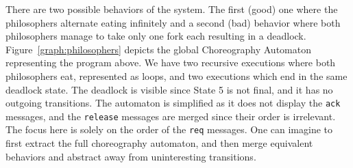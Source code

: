There are two possible behaviors of the system. The first (good) one where the philosophers alternate eating infinitely and a second (bad) behavior 
where both philosophers
manage to take only one fork each %
resulting in a deadlock. 
Figure~\ref{graph:philosophers} depicts the global Choreography Automaton
representing the program above. 
We have two recursive executions where both philosophers
eat, represented as loops, and two executions which end in the same
deadlock state.
%
%
The deadlock is 
visible since State 5 is not final, and it has no outgoing transitions.
  The automaton is simplified %
  as it does not display the \texttt{ack} messages, and the
  \texttt{release} messages are merged since their order is
  irrelevant. The focus here is solely on the order of the
  \texttt{req} messages. One can imagine to first extract the full
  choreography automaton, and then merge equivalent behaviors and abstract away from uninteresting transitions.



